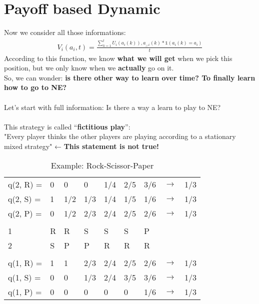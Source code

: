 \section{Payoff based Dynamic}
Now we consider all those informations:
\begin{equation}\label{eq:12}
\begin{aligned}
V_i(a_i, t) = \frac{\sum_{k = 1}^t U_i(a_i(k)), \underset{-}{a_{-i}}(k) * \mathbb{1}(a_i(k) = a_i)}{t}
\end{aligned}
\end{equation}
According to this function, we know \textbf{what we will get} when we pick this position, but we only know when we \textbf{actually} go on it.\\
So, we can wonder: \textbf{is there other way to learn over time? To finally learn how to go to NE?}\\
\\
Let's start with full information: Is there a way a learn to play to NE?\\
\\
This strategy is called “\textbf{fictitious play}”:\\
"Every player thinks the other players are playing according to a stationary mixed strategy" ← \textbf{This statement is not true!}
\begin{table}
    \centering
	\begin{tabular}{| l | l | l | l | l | l | l | l | l |}
\hline
q(2, R) = & 0 & 0 & 0 & 1/4 & 2/5 & 3/6 & $\rightarrow$ & 1/3\\
q(2, S) = & 1 & 1/2 & 1/3 & 1/4 & 1/5 & 1/6 & $\rightarrow$ & 1/3\\
q(2, P) = & 0 & 1/2 & 2/3 & 2/4 & 2/5 & 2/6 & $\rightarrow$ & 1/3\\ \hline
  &   &   &   &   &   &   & &\\
1 & R & R & S & S & S & P & &\\
2 & S & P & P & R & R & R & &\\
  &   &   &   &   &   &   & &\\ \hline
q(1, R) = & 1 & 1 & 2/3 & 2/4 & 2/5 & 2/6 & $\rightarrow$ & 1/3\\
q(1, S) = & 0 & 0 & 1/3 & 2/4 & 3/5 & 3/6 & $\rightarrow$ & 1/3\\
q(1, P) = & 0 & 0 & 0 & 0 & 0 & 1/6 & $\rightarrow$ & 1/3\\ \hline
	\end{tabular}
	\caption{Example: Rock-Scissor-Paper}\label{tab:a} 
\end{table}\\
